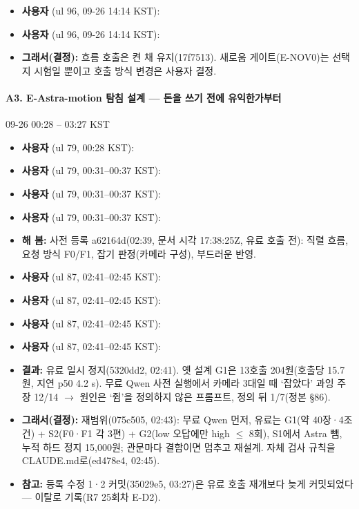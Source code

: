 \begin{itemize}
  \item \textbf{사용자} (ul 96, 09-26 14:14 KST): 
  \item \textbf{사용자} (ul 96, 09-26 14:14 KST): 
  \item \textbf{그래서(결정):} 흐름 호출은 켠 채 유지(17f7513). 새로움 게이트(E-NOV0)는 선택지 시험일 뿐이고 호출 방식 변경은 사용자 결정.
\end{itemize}

\paragraph{A3. E-Astra-motion 탐침 설계 --- 돈을 쓰기 전에 유익한가부터}
{\small 09-26 00:28 -- 03:27 KST}
\begin{itemize}
  \item \textbf{사용자} (ul 79, 00:28 KST): 
  \item \textbf{사용자} (ul 79, 00:31--00:37 KST): 
  \item \textbf{사용자} (ul 79, 00:31--00:37 KST): 
  \item \textbf{사용자} (ul 79, 00:31--00:37 KST): 
  \item \textbf{해 봄:} 사전 등록 a62164d(02:39, 문서 시각 17:38:25Z, 유료 호출 전): 직렬 흐름, 요청 방식 F0/F1, 잡기 판정(카메라 구성), 부드러운 반영.
  \item \textbf{사용자} (ul 87, 02:41--02:45 KST): 
  \item \textbf{사용자} (ul 87, 02:41--02:45 KST): 
  \item \textbf{사용자} (ul 87, 02:41--02:45 KST): 
  \item \textbf{사용자} (ul 87, 02:41--02:45 KST): 
  \item \textbf{결과:} 유료 일시 정지(5320dd2, 02:41). 옛 설계 G1은 13호출 204원(호출당 15.7원, 지연 p50 4.2 s). 무료 Qwen 사전 실행에서 카메라 3대일 때 `잡았다' 과잉 주장 12/14 $\rightarrow$ 원인은 `쥠'을 정의하지 않은 프롬프트, 정의 뒤 1/7(정본 §86).
  \item \textbf{그래서(결정):} 재범위(075c505, 02:43): 무료 Qwen 먼저, 유료는 G1(약 40장·4조건) + S2(F0·F1 각 3편) + G2(low 오답에만 high $\leq$ 8회), S1에서 Astra 뺌, 누적 하드 정지 15,000원; 관문마다 결함이면 멈추고 재설계. 자체 검사 규칙을 CLAUDE.md로(ed478e4, 02:45).
  \item \textbf{참고:} 등록 수정 1·2 커밋(35029e5, 03:27)은 유료 호출 재개보다 늦게 커밋되었다 --- 이탈로 기록(R7 25회차 E-D2).
\end{itemize}

